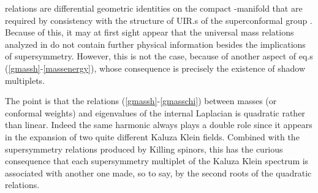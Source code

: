 \documentclass[a4paper,11pt]{article}
\begin{document}
relations are differential geometric identities on the compact
\coordHE{}-manifold \coordHE{} that are required by consistency with
the structure of UIR.s of the superconformal group \coordHE{}. Because of this, it may at first sight appear that
the universal mass relations analyzed in \cite{univer} do not
contain further physical information besides the implications of
supersymmetry. However, this is not the case, because of another
aspect of eq.s (\ref{gmassh}-\ref{massenergy}), whose consequence
is precisely the existence of shadow multiplets.
\par
The point is that the relations (\ref{gmassh}-\ref{gmasschi})
between masses (or conformal weights) and eigenvalues of the
internal Laplacian is quadratic rather than linear. Indeed the
same harmonic always  plays a double role since it appears in the
expansion of two quite different Kaluza Klein fields. Combined
with the supersymmetry relations produced by Killing spinors, this
has the curious consequence that each supersymmetry multiplet of
the Kaluza Klein spectrum is associated with another one made, so
to say, by the second roots of the quadratic relations.
%
%
\end{document}

